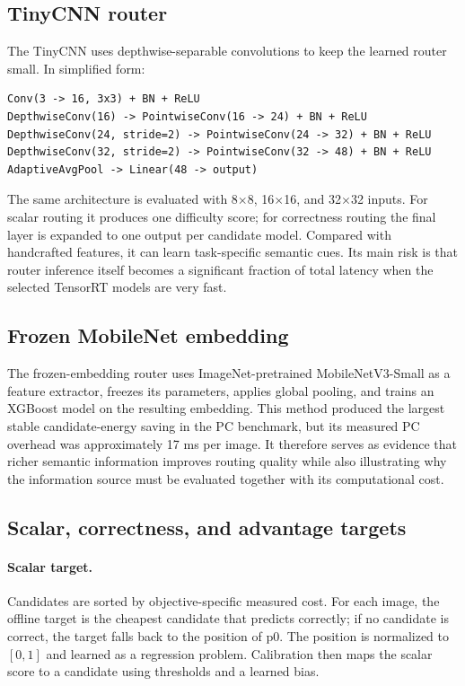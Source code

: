\documentclass[11pt,a4paper]{article}
\begin{document}
\subsection{TinyCNN router}

The TinyCNN uses depthwise-separable convolutions to keep the learned router small. In simplified form:

\begin{lstlisting}
Conv(3 -> 16, 3x3) + BN + ReLU
DepthwiseConv(16) -> PointwiseConv(16 -> 24) + BN + ReLU
DepthwiseConv(24, stride=2) -> PointwiseConv(24 -> 32) + BN + ReLU
DepthwiseConv(32, stride=2) -> PointwiseConv(32 -> 48) + BN + ReLU
AdaptiveAvgPool -> Linear(48 -> output)
\end{lstlisting}

The same architecture is evaluated with 8$\times$8, 16$\times$16, and 32$\times$32 inputs. For scalar routing it produces one difficulty score; for correctness routing the final layer is expanded to one output per candidate model. Compared with handcrafted features, it can learn task-specific semantic cues. Its main risk is that router inference itself becomes a significant fraction of total latency when the selected TensorRT models are very fast.

\subsection{Frozen MobileNet embedding}

The frozen-embedding router uses ImageNet-pretrained MobileNetV3-Small as a feature extractor, freezes its parameters, applies global pooling, and trains an XGBoost model on the resulting embedding. This method produced the largest stable candidate-energy saving in the PC benchmark, but its measured PC overhead was approximately 17 ms per image. It therefore serves as evidence that richer semantic information improves routing quality while also illustrating why the information source must be evaluated together with its computational cost.

\subsection{Scalar, correctness, and advantage targets}

\paragraph{Scalar target.} Candidates are sorted by objective-specific measured cost. For each image, the offline target is the cheapest candidate that predicts correctly; if no candidate is correct, the target falls back to the position of p0. The position is normalized to $[0,1]$ and learned as a regression problem. Calibration then maps the scalar score to a candidate using thresholds and a learned bias.
\end{document}

